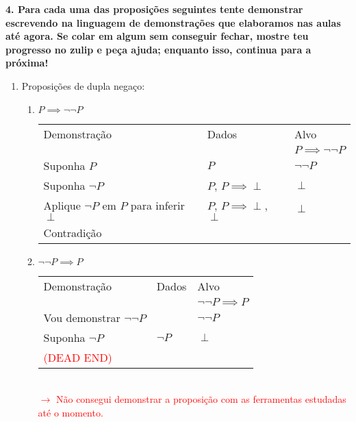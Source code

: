 \documentclass[a4paper, 12pt]{article}
\begin{document}
\noindent \textbf{4. Para cada uma das proposições seguintes tente demonstrar escrevendo na linguagem de demonstrações que elaboramos nas aulas até agora. Se colar em algum sem conseguir fechar, mostre teu progresso no zulip e peça ajuda; enquanto isso, continua para a próxima!}
\begin{enumerate}
    \item Proposições de dupla negaço:
    \begin{enumerate}[1.]
        \item   $P \implies \neg \neg P$
        \begin{table}[h!]
            \centering
            \begin{tabular}{|p{4cm} | p{4cm} | p{4cm} |}
            \rowcolor{gray!50}
             Demonstração & Dados & Alvo \\
              &  & $P \implies \neg \neg P$ \\
              Suponha $P$ & $P$ & $\neg \neg P$  \\
              Suponha $\neg P$ & $P$, $P \implies \perp$ & $\perp$ \\
              Aplique $\neg P$ em $P$ para inferir $\perp$ & $P$, $P \implies \perp$, $\perp$ & $\perp$ \\
              Contradição & & \\
              \hline
             \end{tabular}
        \end{table}
        \item $\neg\neg P \implies P$
        \begin{table}[h!]
            \centering
            \begin{tabular}{|p{4cm} | p{4cm} | p{4cm} |}
            \rowcolor{gray!50}
            Demonstração & Dados & Alvo \\
            & & $\neg\neg P \implies P$ \\
            \hline
            Vou demonstrar $\neg \neg P$ & & $\neg \neg P$ \\
            Suponha $\neg P$ & $\neg P$ & $\perp$ \\
            \textcolor{red}{(DEAD END)} & & \\
            \hline
            \end{tabular}
        \end{table} \\
        \textcolor{red}{$\rightarrow$ Não consegui demonstrar a proposição com as ferramentas estudadas até o momento.}

\end{enumerate}
\end{enumerate}
\end{document}
